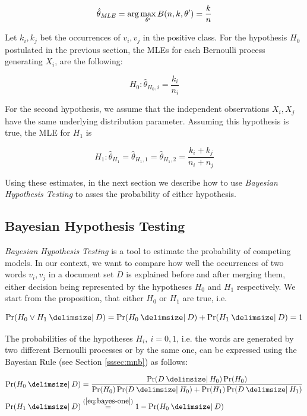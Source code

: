 \begin{equation*}
\hat{\theta}_{\mathit{MLE}} = \arg \max\limits_{\theta'} B(n,k,\theta') =
\frac{k}{n}
\end{equation*}

Let $k_i, k_j$ bet the occurrences of $v_i, v_j$ in the positive class.
For the hypothesis $H_0$ postulated in the previous section, the MLEs for
each Bernoulli process generating $X_i$, are the following:

\begin{equation*}
	H_0: \hat{\theta}_{H_0,i} = \frac{k_i}{n_i}
\end{equation*}

For the second hypothesis, we assume that the independent observations $X_i, X_j$
have the same underlying distribution parameter. Assuming this hypothesis is
true, the MLE for $H_1$ is

\begin{equation*}
H_1: \hat{\theta}_{H_1} =\hat{\theta}_{H_1,1} =
\hat{\theta}_{H_1,2} =
\frac{k_i + k_j}{n_i + n_j}
\end{equation*}

Using these estimates, in the next section we describe how to use \emph{Bayesian
Hypothesis Testing} to asses the probability of either hypothesis.

\subsection{Bayesian Hypothesis Testing}
\label{ssec:bayesian-hypothesis-testing}

\emph{Bayesian Hypothesis Testing} is a tool to estimate the probability of
competing models. In our context, we want
to compare how well the occurrences of two words $v_i, v_j$ in a document set $D$ is
explained before and after merging them, either decision being represented by
the hypotheses $H_0$ and $H_1$ respectively. 
We start from the proposition, that either $H_0$ or $H_1$ are true, i.e.

\begin{equation}
	\label{eq:bayes-one}
	\Pr(H_0 \lor H_1 \given D) = \Pr(H_0 \given D) + \Pr(H_1 \given D) = 1
\end{equation}

The probabilities of the hypotheses $H_i,~i=0,1$, i.e. the
words are generated by two different Bernoulli processes or by the same one, can be expressed using the
Bayesian Rule (see Section \ref{sssec:mnb}) as follows:

\begin{equation*}
\begin{split}
\Pr(H_0\given D) &= \frac{\Pr(D \given H_0)\Pr(H_0)}{\Pr(H_0)\Pr(D \given  H_0) + \Pr(H_1)\Pr(D \given H_1)} \\
\Pr(H_1 \given D) &\stackrel{(\ref{eq:bayes-one})}{=} 1-\Pr(H_0 \given D) 
\end{split}
\end{equation*}

